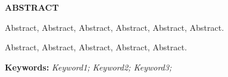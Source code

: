 
\centerline{\bfseries ABSTRACT}

\linespread{1.4}
\bigskip

Abstract,
Abstract,
Abstract,
Abstract,
Abstract,
Abstract.

Abstract,
Abstract,
Abstract,
Abstract,
Abstract.

\bigskip
\noindent\textbf{ Keywords:}
{\itshape Keyword1; Keyword2; Keyword3;}